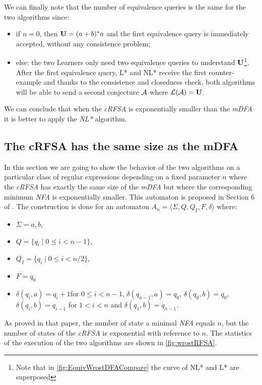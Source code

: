 We can finally note that the number of equivalence queries is the same for the two algorithms since:
\begin{itemize}
  \item if $n = 0$, then $\mathbf{U} = (a+b)^*a$ and the first equivalence query is immediately accepted, without any consistence problem;

  \item else: the two Learners only need two equivalence queries to understand $\mathbf{U}$\footnote{Note that in \cref{fig:EquivWrostDFACompare} the curve of NL* and L* are superposed}. After the first equivalence query, L* and NL* receive the first counter-example and thanks to the consistence and closedness check, both algorithms will be able to send a second conjecture $\mathcal{A}$ where $\mathcal{L}(\mathcal{A}) = \mathbf{U}$.
\end{itemize}

We can conclude that when the \textit{cRFSA} is exponentially smaller than the \textit{mDFA} it is better to apply the \textit{NL*} algorithm.

\subsection{The cRFSA has the same size as the mDFA}
\label{sec:worstRFSA}

In this section we are going to show the behavior of the two algorithms on a particular class of regular expressions depending on a fixed parameter $n$ where the \textit{cRFSA} has exactly the same size of the \textit{mDFA} but where the corresponding minimum \textit{NFA} is exponentially smaller.
This automaton is proposed in Section 6 of \cite{RFSA}. The construction is done for an automaton $A_n = \langle \Sigma, Q, Q_I, F, \delta \rangle $ where:
\begin{itemize}
  \item $\Sigma = {a, b}$,
  \item $Q = \{q_i \mid 0 \leq i < n-1 \}$,
  \item $Q_I = \{q_i \mid 0 \leq i < n/2\}$,
  \item $F = q_0$
  \item $\delta(q_i,a) = q_i+1$for $0 \leq i< n - 1$, $\delta(q_{n-1},a) = q_0$, $\delta(q_0,b)=q_0$, $\delta(q_i,b) = q_{i-1}$ for $1<i<n$ and $\delta(q_1,b)=q_{n-1}$.
\end{itemize}

As proved in that paper, the number of state a minimal \textit{NFA} equals $n$, but the number of states of the \textit{cRFSA} is exponential with reference to $n$.
The statistics of the execution of the two algorithms are shown in \cref{fig:wrostRFSA}.

